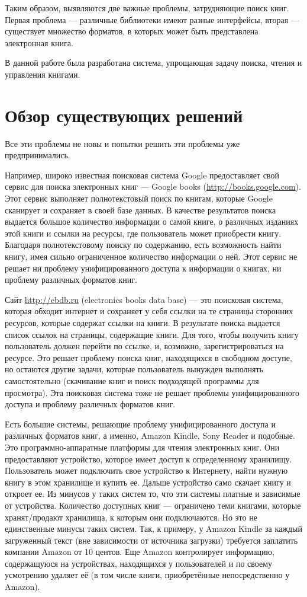 Таким образом, выявляются две важные проблемы, затрудняющие поиск книг. Первая проблема --- различные библиотеки имеют разные интерфейсы, вторая --- существует множество форматов, в которых может быть представлена электронная книга. 

В данной работе была разработана система, упрощающая задачу поиска, чтения и управления книгами. 


\section{Обзор существующих решений}

Все эти проблемы не новы и попытки решить эти проблемы уже предпринимались.

Например, широко известная поисковая система Google предоставляет свой сервис для поиска электронных книг --- Google books (\url{http://books.google.com}). Этот сервис выполняет полнотекстовый поиск по книгам, которые Google сканирует и сохраняет в своей базе данных. В качестве результатов поиска выдается большое количество информации о самой книге, о различных изданиях этой книги и ссылки на ресурсы, где пользователь может приобрести книгу. Благодаря полнотекстовому поиску  по содержанию, есть возможность найти книгу, имея сильно ограниченное количество информации о ней. Этот сервис не решает ни проблему унифицированного доступа к информации о книгах, ни проблему различных форматов книг.

Сайт \url{http://ebdb.ru} (electronics books data base)  --- это поисковая система, которая обходит интернет и сохраняет у себя ссылки на те страницы сторонних ресурсов, которые содержат ссылки на книги. В результате поиска выдается список ссылок на страницы, содержащие книги. Для того, чтобы получить книгу пользователь должен перейти по ссылке, и, возможно, зарегистрироваться на ресурсе. Это решает проблему поиска книг, находящихся в свободном доступе, но остаются другие задачи, которые пользователь вынужден выполнять самостоятельно (скачивание книг и поиск подходящей программы для просмотра). Эта поисковая система тоже не решает проблемы унифицированного доступа и проблему различных форматов книг.

Есть большие системы, решающие проблему унифицированного доступа и различных форматов книг, а именно, Amazon Kindle, Sony Reader и подобные. 
Это программно-аппаратные платформы для чтения электронных книг. Они предоставляют устройство, которое имеет доступ к определенному хранилищу. Пользователь может подключить свое устройство к Интернету, найти нужную книгу в этом хранилище и купить ее. Дальше устройство само скачает книгу и откроет ее.
Из минусов у таких систем то, что эти системы платные и зависимые от устройства. Количество доступных книг --- ограничено теми книгами, которые хранят/продают хранилища, к которым они подключаются. Но это не единственные минусы таких систем. Так, к примеру, у Amazon Kindle за каждый загруженный текст (вне зависимости от источника загрузки) требуется заплатить компании Amazon от 10 центов. Еще Amazon контролирует информацию, содержащуюся на устройствах, находящихся у пользователей и по своему усмотрению удаляет её (в том числе книги, приобретённые непосредственно у Amazon).

